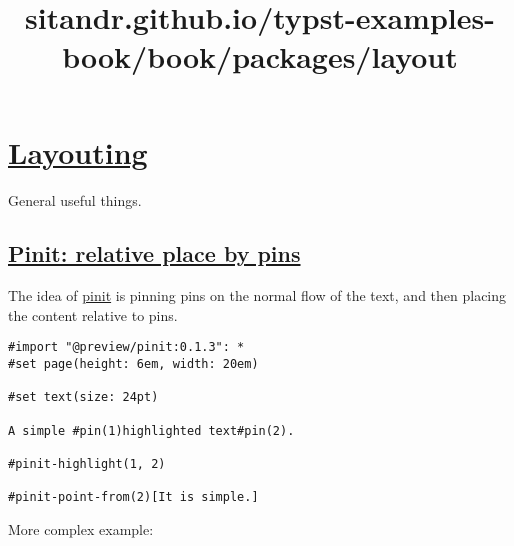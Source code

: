 \title{sitandr.github.io/typst-examples-book/book/packages/layout}

\section{\texorpdfstring{\hyperref[layouting]{Layouting}}{Layouting}}\label{layouting}

General useful things.

\subsection{\texorpdfstring{\hyperref[pinit-relative-place-by-pins]{Pinit:
relative place by
pins}}{Pinit: relative place by pins}}\label{pinit-relative-place-by-pins}

The idea of \href{https://github.com/OrangeX4/typst-pinit}{pinit} is
pinning pins on the normal flow of the text, and then placing the
content relative to pins.

\begin{verbatim}
#import "@preview/pinit:0.1.3": *
#set page(height: 6em, width: 20em)

#set text(size: 24pt)

A simple #pin(1)highlighted text#pin(2).

#pinit-highlight(1, 2)

#pinit-point-from(2)[It is simple.]
\end{verbatim}

\pandocbounded{}

More complex example:

